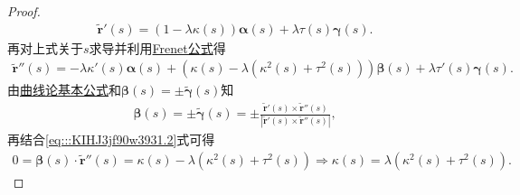 \documentclass[../../main.tex]{subfiles}%
\begin{document}
\begin{proof}
\begin{align*}
\tilde{\bm{r}}'(s) = \left(1 - \lambda\kappa(s)\right)\bm{\alpha}(s) + \lambda\tau(s)\bm{\gamma}(s).
\end{align*}
再对上式关于$s$求导并利用\hyperref[theorem:微分几何-Frenet公式]{Frenet公式}得
\begin{align}
\tilde{\bm{r}}''(s)
= -\lambda\kappa'(s)\bm{\alpha}(s)
+ \left( \kappa(s) - \lambda\left( \kappa^2(s) + \tau^2(s) \right) \right)\bm{\beta}(s)
+ \lambda\tau'(s)\bm{\gamma}(s).
\label{eq:::KIHJ3jf90w3931.2}
\end{align}
由\hyperref[theorem:曲线论基本公式]{曲线论基本公式}和$\bm{\beta}(s) = \pm \tilde{\bm{\gamma}}(s)$知
\begin{align*}
\bm{\beta}(s) = \pm \tilde{\bm{\gamma}}(s)
= \pm \frac{\tilde{\bm{r}}'(s) \times \tilde{\bm{r}}''(s)}{\left| \tilde{\bm{r}}'(s) \times \tilde{\bm{r}}''(s) \right|},
\end{align*}
再结合\eqref{eq:::KIHJ3jf90w3931.2}式可得
\begin{align*}
0 = \bm{\beta}(s) \cdot \tilde{\bm{r}}''(s)
= \kappa(s) - \lambda\left( \kappa^2(s) + \tau^2(s) \right)
\Longrightarrow \kappa(s) = \lambda\left( \kappa^2(s) + \tau^2(s) \right).
\end{align*}
\end{proof}
\end{document}
